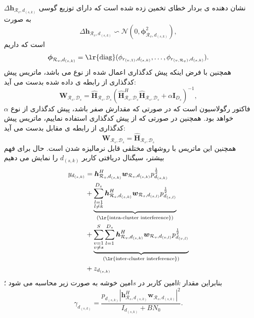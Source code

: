 $\Delta \boldsymbol{h}_{\mathcal{R}_v,d_{(s,k)}}$
نشان دهنده ی بردار خطای تخمین زده شده است که دارای توزیع گوسی به صورت
$$\Delta \boldsymbol{h}_{\mathcal{R}_v,d_{(s,k)}}\backsim \mathcal{N}(0,\boldsymbol{\phi}_{\mathcal{R}_v,d_{(s,k)}}^2),$$
است که  داریم 
$$\boldsymbol{\phi}_{\mathcal{R}_v,d_{(s,k)}} = \text{\lr{diag}}(\phi_{r_{(v,1)},d_{(s,k)}},\ldots,\phi_{r_{(v,\mathcal{R}_v)},d_{(s,k)}}).$$
همچنین با فرض اینکه پیش کدگذاری اعمال شده از نوع  می باشد، ماتریس پیش کدگذاری از رابطه ی داده شده بدست می آید:
\begin{equation}
\boldsymbol{W}_{\mathcal{R}_s,\mathcal{D}_s} = \hat{\boldsymbol{H}}_{\mathcal{R}_s,\mathcal{D}_s}(\hat{\boldsymbol{H}}_{\mathcal{R}_s,\mathcal{D}_s}^H \hat{\boldsymbol{H}}_{\mathcal{R}_s,\mathcal{D}_s}+ \alpha \boldsymbol{I}_{{D}_s})^{-1},
\end{equation} 
 $\alpha$
  فاکتور رگولاسیون است که در صورتی که
  مقدارش صفر باشد، پیش کدگذاری
از نوع  
  خواهد بود.
همچنین در صورتی که از پیش کدگذاری  استفاده نماییم، ماتریس پیش کدگذاری از رابطه ی مقابل بدست می آید:
\begin{equation}
\boldsymbol{W}_{\mathcal{R}_s,\mathcal{D}_s} = \hat{\boldsymbol{H}}_{\mathcal{R}_s,\mathcal{D}_s}
\end{equation} 
همچنین این ماتریس با روشهای مختلفی قابل نرمالیزه شدن است.
حال برای فهم بیشتر، سیگنال دریافتی کاربر $d_{(s,k)}$ را نمایش می دهیم
\begin{equation}
\begin{split}
y_{d_{(s,k)}} &= \boldsymbol{h}_{\mathcal{R}_s, d_{(s,k)}}^H  \boldsymbol{w}_{\mathcal{R}_{s},d_{(s,k)}} p_{d_{(s,k)}}^\frac{1}{2}\\
&+ \underbrace{\sum_{\substack{l=1 \\ l\neq k}}^{{D}_s} \boldsymbol{h}_{\mathcal{R}_s, d_{(s,k)}}^H \boldsymbol{w}_{\mathcal{R}_{s},d_{(s,l)}}  p_{d_{(s,l)}}^\frac{1}{2}}_{\text{(\lr{intra-cluster interference})}}\\
&+\underbrace{\sum_{\substack{v=1 \\ v\neq s}}^{S} \sum_{l=1}^{{D}_s} \boldsymbol{h}_{\mathcal{R}_v, d_{(s,k)}}^H \boldsymbol{w}_{\mathcal{R}_{v},d_{(v,l)}} p_{d_{(v,l)}}^\frac{1}{2}}_{\text{(\lr{inter-cluster interference})}}\\
& +z_{d_{(s,k)}}
\end{split}
\end{equation}
بنابراین مقدار   $k$امین کاربر در $s$امین خوشه به صورت زیر محاسبه می شود \cite{algamal, cover}؛
\begin{equation}\label{5}
\gamma_{d_{(s,k)}}= \frac{p_{d_{(s,k)}}|\boldsymbol{h}_{\mathcal{R}_s, d_{(s,k)}}^H \boldsymbol{w}_{\mathcal{R}_{s},d_{(s,k)}}|^2}{I_{d_{(s,k)}}+BN_0}.
\end{equation}
